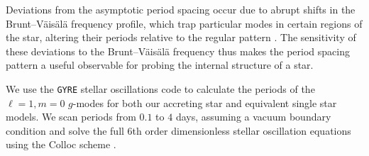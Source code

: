 \documentclass[twocolumn, twocolappendix, oneside]{aastex631}
\newcommand{\bvf}{Brunt–Väisälä frequency\xspace}
\newcommand{\gmodes}{$g$-modes\xspace}
\newcommand{\gyre}{\texttt{GYRE}\xspace}
\begin{document}
Deviations from the asymptotic period spacing occur due to abrupt shifts in the \bvf profile, which trap particular modes in certain regions of the star, altering their periods relative to the regular pattern \citep[e.g.][]{Miglio+2008}. The sensitivity of these deviations to the \bvf thus makes the period spacing pattern a useful observable for probing the internal structure of a star.

We use the \gyre stellar oscillations code \citep{Townsend+2013,Townsend+2018,Goldstein+2020,Sun+2023} to calculate the periods of the ${\ell = 1}, {m = 0}$ \gmodes for both our accreting star and equivalent single star models. We scan periods from $0.1$ to $4$ days, assuming a vacuum boundary condition and solve the full 6th order dimensionless stellar oscillation equations using the Colloc scheme \citep{Dziembowski+1971, Christensen-Dalsgaard+2008}.
\end{document}
